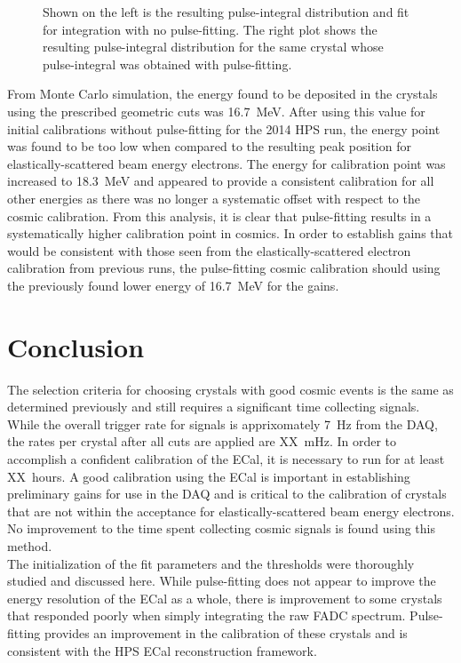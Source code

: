 \documentclass[twoside]{article}
\begin{document}
\begin{figure}[hbt]
\begin{minipage}{0.5\textwidth}
 \end{minipage}
  \caption{Shown on the left is the resulting pulse-integral distribution and fit for integration with no pulse-fitting. The right plot shows the resulting pulse-integral distribution for the same crystal whose pulse-integral was obtained with pulse-fitting.}
  \label{fig:compareResults}
\end{figure}
\indent From Monte Carlo simulation, the energy found to be deposited in the crystals using the prescribed geometric cuts was 16.7~MeV. After using this value for initial calibrations without pulse-fitting for the 2014 HPS run, the energy point was found to be too low when compared to the resulting peak position for elastically-scattered beam energy electrons. The energy for calibration point was increased to 18.3~MeV and appeared to provide a consistent calibration for all other energies as there was no longer a systematic offset with respect to the cosmic calibration. From this analysis, it is clear that pulse-fitting results in a systematically higher calibration point in cosmics. In order to establish gains that would be consistent with those seen from the elastically-scattered electron calibration from previous runs, the pulse-fitting cosmic calibration should using the previously found lower energy of 16.7~MeV for the gains. 


\section{Conclusion}
The selection criteria for choosing crystals with good cosmic events is the same as determined previously and still requires a significant time collecting signals. While the overall trigger rate for signals is apprixomately 7~Hz from the DAQ, the rates per crystal after all cuts are applied are XX~mHz. In order to accomplish a confident calibration of the ECal, it is necessary to run for at least XX~hours. A good calibration using the ECal is important in establishing preliminary gains for use in the DAQ and is critical to the calibration of crystals that are not within the acceptance for elastically-scattered beam energy electrons. No improvement to the time spent collecting cosmic signals is found using this method.\\
\indent The initialization of the fit parameters and the thresholds were thoroughly studied and discussed here. While pulse-fitting does not appear to improve the energy resolution of the ECal as a whole, there is improvement to some crystals that responded poorly when simply integrating the raw FADC spectrum. Pulse-fitting provides an improvement in the calibration of these crystals and is consistent with the HPS ECal reconstruction framework.\\
\end{document}
